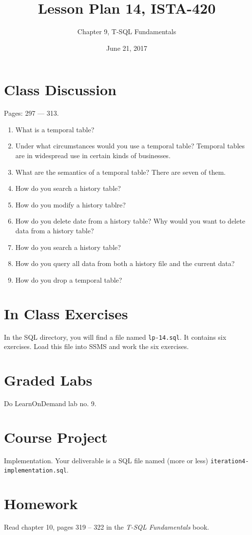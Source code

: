 \documentclass{article}
\title{Lesson Plan 14, ISTA-420}
\author{Chapter 9, T-SQL Fundamentals}
\date{June 21, 2017}
\begin{document}
    

    \maketitle{}

    \section{Class Discussion}

    Pages: 297 --- 313.

    \begin{enumerate}
        \item What is a temporal table?
        \item Under what circumstances would you use a temporal table? Temporal tables are in widespread use in certain kinds of businesses.
        \item What are the semantics of a temporal table? There are seven of them.
        \item How do you search a history table?
        \item How do you modify a history tablre?
        \item How do you delete date from a history table? Why would you want to delete data from a history table?
        \item How do you search a history table?
        \item How do you query all data from both a history file and the current data?
        \item How do you drop a temporal table?
    \end{enumerate}

    \section{In Class Exercises}

    In the SQL directory, you will find a file named \texttt{lp-14.sql}. It contains six exercises. Load this file into SSMS and work the six exercises.

    \section{Graded Labs}

    Do LearnOnDemand lab no. 9.

    \section{Course Project}

    Implementation. Your deliverable is a SQL file named (more or less) \texttt{iteration4-implementation.sql}.

    \section{Homework}

        Read chapter  10, pages 319  --  322 in the \textit{T-SQL Fundamentals} book.
        
\end{document}
